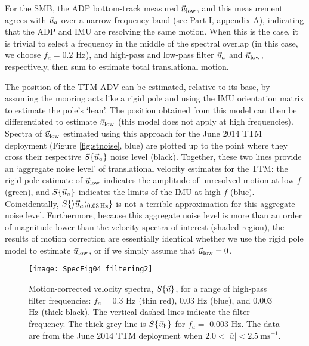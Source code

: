 For the SMB, the ADP bottom-track measured $\vec{u}_\mathrm{low}$, and this measurement agrees with $\vec{u}_a$ over a narrow frequency band (see Part I, appendix A), indicating that the ADP and IMU are resolving the same motion. When this is the case, it is trivial to select a frequency in the middle of the spectral overlap (in this case, we choose $f_a=0.2$ Hz), and high-pass and low-pass filter $\vec{u}_a$ and $\vec{u}_\mathrm{low}$, respectively, then sum to estimate total translational motion.

The position of the TTM ADV can be estimated, relative to its base, by assuming the mooring acts like a rigid pole and using the IMU orientation matrix to estimate the pole's `lean'. The position obtained from this model can then be differentiated to estimate $\vec{u}_\mathrm{low}$ (this model does not apply at high frequencies). Spectra of $\vec{u}_\mathrm{low}$ estimated using this approach for the June 2014 TTM deployment (Figure \ref{fig:stnoise}, blue) are plotted up to the point where they cross their respective $S\{\vec{u}_a\}$ noise level (black).  Together, these two lines provide an `aggregate noise level' of translational velocity estimates for the TTM: the rigid pole estimate of $\vec{u}_\mathrm{low}$ indicates the amplitude of unresolved motion at low-$f$ (green), and $S\{\vec{u}_a\}$ indicates the limits of the IMU at high-$f$ (blue). Coincidentally, $S\{\rangle\vec{u}_a\langle_{0.03\,\mathrm{Hz}}\}$ is not a terrible approximation for this aggregate noise level. Furthermore, because this aggregate noise level is more than an order of magnitude lower than the velocity spectra of interest (shaded region), the results of motion correction are essentially identical whether we use the rigid pole model to estimate $\vec{u}_\mathrm{low}$, or if we simply assume that $\vec{u}_\mathrm{low} = 0$. 


\begin{figure}[t]
  \centering
  \texttt{[image: SpecFig04\_filtering2]}
  \caption{Motion-corrected velocity spectra, $S\{\vec{u}\}$, for a range of high-pass filter frequencies: $f_a= 0.3$ Hz (thin red), 0.03 Hz (blue), and 0.003 Hz (thick black). The vertical dashed lines indicate the filter frequency. The thick grey line is $S\{\vec{u}_{\mathrm{h}}\}$ for $f_a=$ 0.003 Hz. The data are from the June 2014 TTM deployment when $2.0 < |\bar{u}| < 2.5\ \mathrm{ms^{-1}}$.
}
  \label{fig:filts}
\end{figure}

